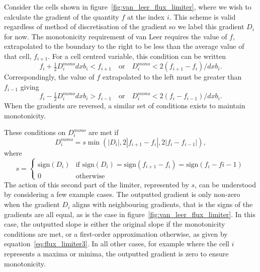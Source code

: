 Consider the cells shown in figure~\ref{fig:van_leer_flux_limiter}, where we wish to calculate the gradient of the quantity $f$ at the index $i$. This scheme is valid regardless of method of discretisation of the gradient so we label this gradient $D_i$ for now. The monotonicity requirement of van Leer requires the value of $f$, extrapolated to the boundary to the right to be less than the average value of that cell, $f_{i+1}$. For a cell centred variable, this condition can be written
\begin{equation}
  \label{eq:flux_limiter1}
f_i + \tfrac{1}{2}D_i^{mono} dxb_i < f_{i+1} \quad \text{or} \quad D_i^{mono} < 2 (f_{i+1} - f_i) / dxb_i.
\end{equation}
Correspondingly, the value of $f$ extrapolated to the left must be greater than $f_{i-1}$ giving
\begin{equation}
  \label{eq:flux_limiter2}
f_i - \tfrac{1}{2}D_i^{mono} dxb_i > f_{i-1} \quad \text{or} \quad D_i^{mono} < 2 (f_{i} - f_{i-1}) / dxb_i.
\end{equation}
When the gradients are reversed, a similar set of conditions exists to maintain monotonicity.

These conditions on $D_i^{mono}$ are met if
\begin{equation}
  \label{eq:flux_limiter3}
D_i^{mono} = s \min(|D_i|, 2 | f_{i+1} - f_i |, 2 |f_i - f_{i-1}|),
\end{equation}
where
\begin{equation}
  \label{eq:flux_limiter4}
s =
\left\{
	\begin{array}{ll}
		\text{sign}(D_i)  & \mbox{if } \text{sign}(D_i) = \text{sign}(f_{i+1} - f_i) = \text{sign}(f_{i} - f{i-1}) \\
		0 & \mbox{otherwise}
	\end{array}
\right.
\end{equation}
The action of this second part of the limiter, represented by $s$, can be understood by considering a few example cases. The outputted gradient is only non-zero when the gradient $D_i$ aligns with neighbouring gradients, that is the signs of the gradients are all equal, as is the case in figure~\ref{fig:van_leer_flux_limiter}. In this case, the outputted slope is either the original slope if the monotonicity conditions are met, or a first-order approximation otherwise, as given by equation~\ref{eq:flux_limiter3}. In all other cases, for example where the cell $i$ represents a maxima or minima, the outputted gradient is zero to ensure monotonicity.

